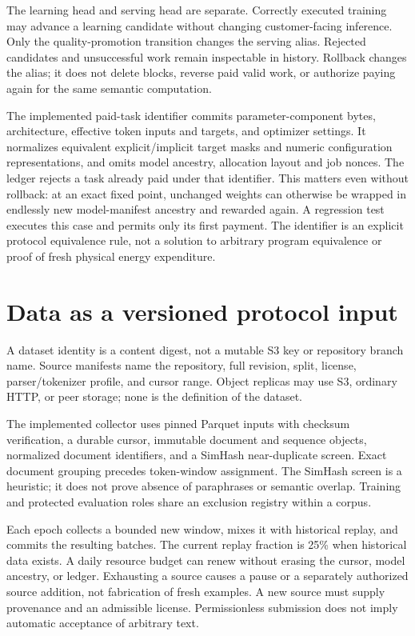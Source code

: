 \documentclass[11pt]{article}
\begin{document}
The learning head and serving head are separate. Correctly executed training may advance a learning candidate without changing customer-facing inference. Only the quality-promotion transition changes the serving alias. Rejected candidates and unsuccessful work remain inspectable in history. Rollback changes the alias; it does not delete blocks, reverse paid valid work, or authorize paying again for the same semantic computation.

The implemented paid-task identifier commits parameter-component bytes,
architecture, effective token inputs and targets, and optimizer settings. It
normalizes equivalent explicit/implicit target masks and numeric configuration
representations, and omits model ancestry, allocation layout and job nonces.
The ledger rejects a task already paid under that identifier. This matters even
without rollback: at an exact fixed point, unchanged weights can otherwise be
wrapped in endlessly new model-manifest ancestry and rewarded again. A
regression test executes this case and permits only its first payment. The
identifier is an explicit protocol equivalence rule, not a solution to arbitrary
program equivalence or proof of fresh physical energy expenditure.

\section{Data as a versioned protocol input}
A dataset identity is a content digest, not a mutable S3 key or repository branch name. Source manifests name the repository, full revision, split, license, parser/tokenizer profile, and cursor range. Object replicas may use S3, ordinary HTTP, or peer storage; none is the definition of the dataset.

The implemented collector uses pinned Parquet inputs with checksum verification, a durable cursor, immutable document and sequence objects, normalized document identifiers, and a SimHash near-duplicate screen. Exact document grouping precedes token-window assignment. The SimHash screen is a heuristic; it does not prove absence of paraphrases or semantic overlap. Training and protected evaluation roles share an exclusion registry within a corpus.

Each epoch collects a bounded new window, mixes it with historical replay, and commits the resulting batches. The current replay fraction is 25\% when historical data exists. A daily resource budget can renew without erasing the cursor, model ancestry, or ledger. Exhausting a source causes a pause or a separately authorized source addition, not fabrication of fresh examples. A new source must supply provenance and an admissible license. Permissionless submission does not imply automatic acceptance of arbitrary text.
\end{document}
